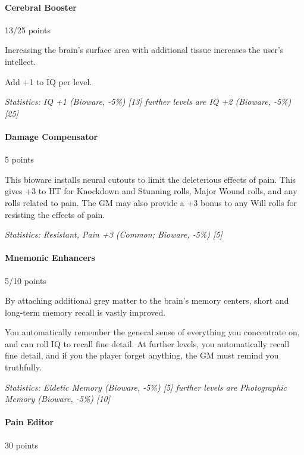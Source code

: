 \begin{multicols*}{3}
	\paragraph{Cerebral Booster}
	\begin{flushright}
		13/25 points
	\end{flushright}
	
	Increasing the brain's surface area with additional tissue increases the user's intellect. 
	
	Add +1 to IQ per level. 
	
	\textit{\textcolor{OliveGreen}{Statistics: IQ +1 (Bioware, -5\%) [13] further levels are IQ +2 (Bioware, -5\%) [25]}}
	
	\paragraph{Damage Compensator}
	\begin{flushright}
		5 points
	\end{flushright}
	
	This bioware installs neural cutouts to limit the deleterious effects of pain. This gives +3 to HT for Knockdown and Stunning rolls, Major Wound rolls, and any rolls related to pain. The GM may also provide a +3 bonus to any Will rolls for resisting the effects of pain.
	
	\textit{\textcolor{OliveGreen}{Statistics: Resistant, Pain +3 (Common; Bioware, -5\%) [5] }}
	
	\paragraph{Mnemonic Enhancers}
	\begin{flushright}
		5/10 points
	\end{flushright}
	
	By attaching additional grey matter to the brain's memory centers, short and long-term memory recall is vastly improved. 
	
	You automatically remember the general sense of everything you concentrate on, and can roll IQ to recall fine detail. At further levels, you automatically recall fine detail, and if you the player forget anything, the GM must remind you truthfully. 
	
	\textit{\textcolor{OliveGreen}{Statistics: Eidetic Memory (Bioware, -5\%) [5] further levels are Photographic Memory (Bioware, -5\%) [10]}}
	
	\paragraph{Pain Editor}\label{pain_editor}
	\begin{flushright}
		30 points
	\end{flushright}


\end{multicols*}
